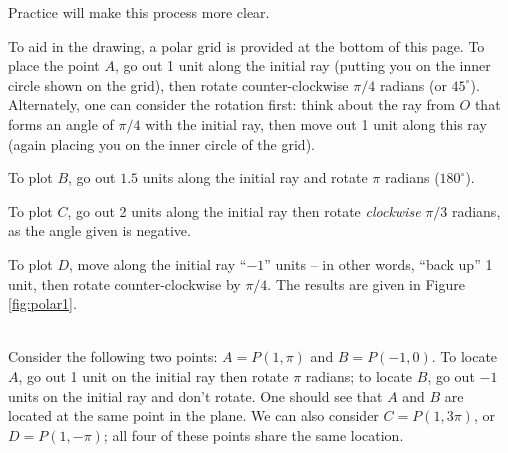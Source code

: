 Practice will make this process more clear.\\

{%
To aid in the drawing, a polar grid is provided at the bottom of this page. To place the point $A$, go out 1 unit along the initial ray (putting you on the inner circle shown on the grid), then rotate counter-clockwise $\pi/4$ radians (or $45^\circ$).  Alternately, one can consider the rotation first: think about the ray from $O$ that forms an angle of $\pi/4$ with the initial ray, then move out 1 unit along this ray (again placing you on the inner circle of the grid).

To plot $B$, go out $1.5$ units along the initial ray and rotate $\pi$ radians ($180^\circ$). 

To plot $C$, go out 2 units along the initial ray then rotate \textit{clockwise} $\pi/3$ radians, as the angle given is negative.

To plot $D$, move along the initial ray ``$-1$'' units -- in other words, ``back up'' 1 unit, then rotate counter-clockwise by $\pi/4$. The results are given in Figure \ref{fig:polar1}.
}\\

Consider the following two points: $A = P(1,\pi)$ and $B = P(-1,0)$. To locate $A$, go out 1 unit on the initial ray then rotate $\pi$ radians; to locate $B$, go out $-1$ units on the initial ray and don't rotate. One should see that $A$ and $B$ are located at the same point in the plane. We can also consider $C=P(1,3\pi)$, or $D = P(1,-\pi)$; all four of these points share the same location. 


